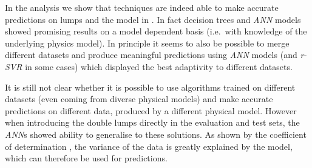 In the analysis we show that \ml techniques are indeed able to make accurate predictions on lumps and the \wzw model in \sft.
In fact decision trees and \emph{ANN} models showed promising results on a model dependent basis (i.e.\ with knowledge of the underlying physics model).
In principle it seems to also be possible to merge different datasets and produce meaningful predictions using \emph{ANN} models (and \emph{r-SVR} in some cases) which displayed the best adaptivity to different datasets.

It is still not clear whether it is possible to use algorithms trained on different datasets (even coming from diverse physical models) and make accurate predictions on different data, produced by a different physical model.
However when introducing the double lumps directly in the evaluation and test sets, the \emph{ANN}s showed ability to generalise to these solutions.
As shown by the coefficient of determination \rr, the variance of the data is greatly explained by the model, which can therefore be used for predictions.
